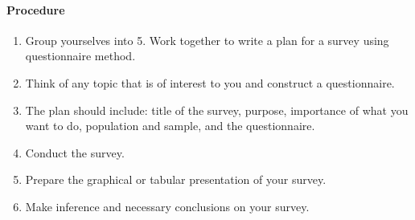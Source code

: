 \paragraph*{Procedure}
\begin{enumerate}
\item Group yourselves into 5. Work together to write a plan for a survey using questionnaire
method.
\item Think of any topic that is of interest to you and construct a questionnaire.
\item The plan should include: title of the survey, purpose, importance of what you want to
do, population and sample, and the questionnaire.
\item Conduct the survey.
\item Prepare the graphical or tabular presentation of your survey.
\item Make inference and necessary conclusions on your survey.
\end{enumerate}